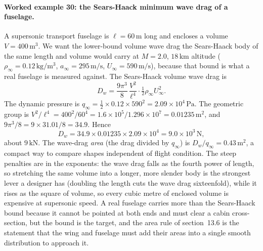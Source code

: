 \paragraph{Worked example 30: the Sears-Haack minimum wave drag of a
fuselage.} A supersonic transport fuselage is $\ell = 60\,\si{\meter}$
long and encloses a volume $V = 400\,\si{\meter}^3$. We want the
lower-bound volume wave drag the Sears-Haack body of the same length and
volume would carry at $M = 2.0$, $18\,\si{\kilo\meter}$ altitude
($\rho_\infty = 0.12\,\si{\kilogram\per\meter\cubed}$,
$a_\infty = 295\,\si{\meter\per\second}$,
$U_\infty = 590\,\si{\meter\per\second}$), because that bound is what a
real fuselage is measured against. The Sears-Haack volume wave drag is
\[
D_w = \frac{9\pi^3}{8}\,\frac{V^2}{\ell^4}\cdot\tfrac{1}{2}\rho_\infty
U_\infty^2.
\]
The dynamic pressure is
$q_\infty = \tfrac{1}{2}\times 0.12\times 590^2 =
2.09\times 10^{4}\,\text{Pa}$. The geometric group is
$V^2/\ell^4 = 400^2/60^4 = 1.6\times 10^{5}/1.296\times 10^{7} =
0.01235\,\si{\meter}^2$, and $9\pi^3/8 = 9\times 31.01/8 = 34.9$. Hence
\[
D_w = 34.9\times 0.01235\times 2.09\times 10^{4} = 9.0\times 10^{3}\,
\si{\newton},
\]
about $9\,\text{kN}$. The wave-drag \emph{area} (the drag divided by
$q_\infty$) is $D_w/q_\infty = 0.43\,\si{\meter}^2$, a compact way to
compare shapes independent of flight condition. The steep penalties are
in the exponents: the wave drag falls as the fourth power of length, so
stretching the same volume into a longer, more slender body is the
strongest lever a designer has (doubling the length cuts the wave drag
sixteenfold), while it rises as the square of volume, so every cubic
metre of enclosed volume is expensive at supersonic speed. A real
fuselage carries more than the Sears-Haack bound because it cannot be
pointed at both ends and must clear a cabin cross-section, but the bound
is the target, and the area rule of section~13.6 is the statement that
the wing and fuselage must add their areas into a single smooth
distribution to approach it.

